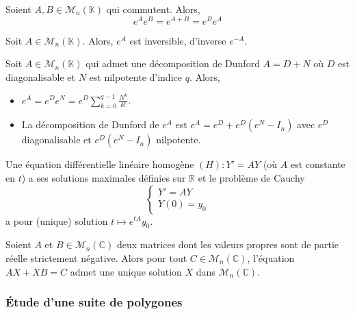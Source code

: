   \begin{proposition}
    Soient $A, B \in \mathcal{M}_n(\mathbb{K})$ qui commutent. Alors,
    \[ e^A e^B = e^{A+B} = e^B e^A \]
  \end{proposition}

  \begin{corollary}
    Soit $A \in \mathcal{M}_n(\mathbb{K})$. Alors, $e^A$ est inversible, d'inverse $e^{-A}$.
  \end{corollary}

  \begin{example}
    Soit $A \in \mathcal{M}_n(\mathbb{K})$ qui admet une décomposition de Dunford $A = D+N$ où $D$ est diagonalisable et $N$ est nilpotente d'indice $q$. Alors,
    \begin{itemize}
      \item $e^A = e^D e^N = e^D \sum_{k=0}^{q-1} \frac{N^k}{k!}$.
      \item La décomposition de Dunford de $e^A$ est $e^A = e^D + e^D(e^N - I_n)$ avec $e^D$ diagonalisable et $e^D(e^N - I_n)$ nilpotente.
    \end{itemize}
  \end{example}


  \begin{application}
    Une équation différentielle linéaire homogène $(H) : Y' = AY$ (où $A$ est constante en $t$) a ses solutions maximales définies sur $\mathbb{R}$ et le problème de Cauchy
    \[ \begin{cases} Y' = AY \\ Y(0) = y_0 \end{cases} \]
    a pour (unique) solution $t \mapsto e^{tA} y_0$.
  \end{application}


  \begin{application}
    Soient $A$ et $B \in \mathcal{M}_n(\mathbb{C})$ deux matrices dont les valeurs propres sont de partie réelle strictement négative. Alors pour tout $C \in \mathcal{M}_n(\mathbb{C})$, l'équation $AX + XB = C$ admet une unique solution $X$ dans $\mathcal{M}_n(\mathbb{C})$.
  \end{application}

  \subsubsection{Étude d'une suite de polygones}

